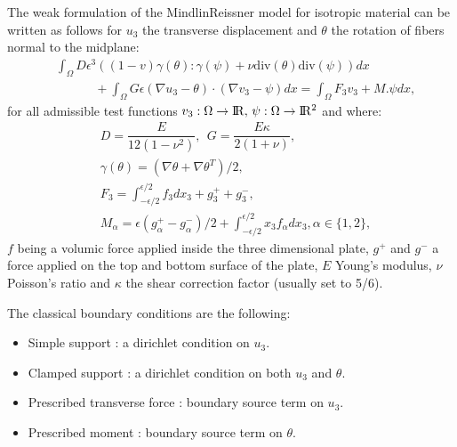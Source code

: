 \documentclass[a4paper,11pt,english]{sphinxmanual}
\begin{document}
The weak formulation of the Mindlin\sphinxhyphen{}Reissner model for isotropic material can be written as follows for \(u_3\) the transverse displacement and \(\theta\) the rotation of fibers normal to the mid\sphinxhyphen{}plane:
\begin{equation*}
\begin{split}& \int_{\Omega} D \epsilon^3\left((1-v)\gamma(\theta):\gamma(\psi) + \nu \mbox{div}(\theta)\mbox{div}(\psi)\right) dx \\
& ~~~~~~~~~~~~~~ + \int_{\Omega}G\epsilon (\nabla u_3 - \theta)\cdot(\nabla v_3 - \psi)dx = \int_{\Omega} F_3v_3 + M.\psi dx,\end{split}
\end{equation*}
for all admissible test functions \(v_3 : \Omega \rightarrow \rm I\hspace{-0.15em}R,$ $\psi : \Omega \rightarrow \rm I\hspace{-0.15em}R^2\) and where:
\begin{equation*}
\begin{split}& D = \dfrac{E}{12(1-\nu^2)}, ~~ G = \dfrac{E\kappa}{2(1+\nu)}, \\
& \gamma(\theta) = (\nabla \theta + \nabla \theta^T)/2, \\
& F_3 = \int_{-\epsilon/2}^{\epsilon/2} f_3dx_3 + g_3^+ + g_3^-, \\
& M_{\alpha} = \epsilon(g^+_{\alpha} - g^-_{\alpha})/2 +  \int_{-\epsilon/2}^{\epsilon/2} x_3 f_{\alpha}dx_3, \alpha \in \{1, 2\},\end{split}
\end{equation*}
\(f\) being a volumic force applied inside the three dimensional plate, \(g^+\) and \(g^-\) a force applied on the top and bottom surface of the plate, \(E\) Young’s modulus, \(\nu\) Poisson’s ratio and \(\kappa\) the shear correction factor (usually set to 5/6).

The classical boundary conditions are the following:
\begin{itemize}
\item {} 
Simple support :  a dirichlet condition on \(u_3\).

\item {} 
Clamped support : a dirichlet condition on both \(u_3\) and \(\theta\).

\item {} 
Prescribed transverse force : boundary source term on \(u_3\).

\item {} 
Prescribed moment : boundary source term on \(\theta\).

\end{itemize}
\end{document}
